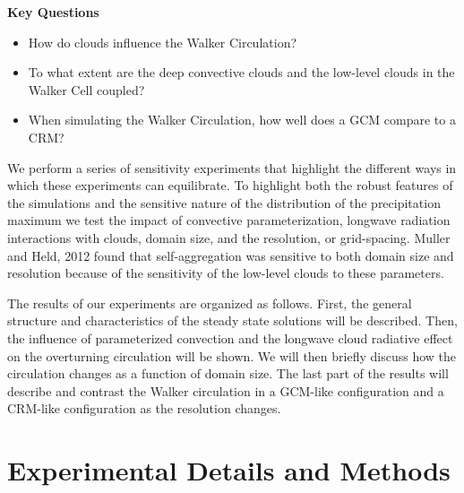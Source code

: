 \documentclass[draft]{agujournal2019}
\begin{document}
\textbf{Key Questions}
\begin{itemize}
  \item{How do clouds influence the Walker Circulation?}
  \item{To what extent are the deep convective clouds and the low-level clouds in the Walker Cell coupled?}
  \item{When simulating the Walker Circulation, how well does a GCM compare to a CRM?}  
\end{itemize}

We perform a series of sensitivity experiments that highlight the different ways in which these experiments can equilibrate.  To 
highlight both the robust features of the simulations and the sensitive nature of the distribution of the precipitation maximum 
we test the impact of convective parameterization, 
longwave radiation interactions with clouds, domain size, 
and the resolution, or grid-spacing.    Muller and Held, 2012 found that self-aggregation was sensitive to both domain size and resolution
because of the sensitivity of the low-level clouds to these parameters.  %

The results of our experiments are organized as follows.  First, the general structure and characteristics of the steady state solutions
will be described.   Then, the influence of parameterized convection and the longwave cloud radiative effect on the overturning 
circulation will be shown.  We will then briefly discuss how the circulation changes as a function of domain size.  The last part of the
results will describe and contrast the Walker circulation in a GCM-like configuration and a CRM-like configuration as the 
resolution changes.

\section{Experimental Details and Methods}
\end{document}

